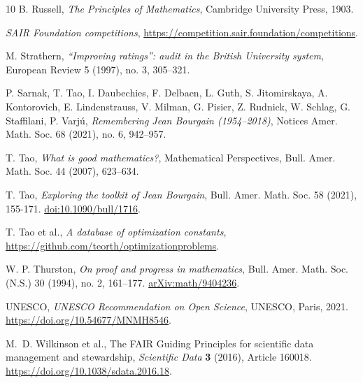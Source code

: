 \documentclass[12pt]{amsart}
\theoremstyle{definition}
\begin{document}
\begin{thebibliography}{10}
B. Russell, \emph{The Principles of Mathematics}, Cambridge University Press, 1903.

\emph{SAIR Foundation competitions}, \url{https://competition.sair.foundation/competitions}.

M. Strathern, \emph{``Improving ratings'': audit in the British University system}, European Review 5 (1997), no. 3, 305--321.

P. Sarnak, T. Tao, I. Daubechies, F. Delbaen, L. Guth, S. Jitomirskaya, A. Kontorovich, E. Lindenstrauss, V. Milman, G. Pisier, Z. Rudnick, W. Schlag, G. Staffilani, P. Varjú, \emph{Remembering Jean Bourgain (1954--2018)}, Notices Amer. Math. Soc. 68 (2021), no. 6, 942--957.

T. Tao, \emph{What is good mathematics?}, Mathematical Perspectives, Bull. Amer. Math. Soc. 44 (2007), 623--634.

T. Tao, \emph{Exploring the toolkit of Jean Bourgain}, Bull. Amer. Math. Soc. 58 (2021), 155-171. \href{https://doi.org/10.1090/bull/1716}{doi:10.1090/bull/1716}.

T. Tao et al., \emph{A database of optimization constants}, \url{https://github.com/teorth/optimizationproblems}.

W. P. Thurston, \emph{On proof and progress in mathematics}, Bull. Amer. Math. Soc. (N.S.) 30 (1994), no. 2, 161--177. \href{https://arxiv.org/abs/math/9404236}{arXiv:math/9404236}.

UNESCO,
\newblock \emph{UNESCO Recommendation on Open Science},
\newblock UNESCO, Paris, 2021.
\newblock \url{https://doi.org/10.54677/MNMH8546}.

M.~D. Wilkinson et al.,
\newblock The FAIR Guiding Principles for scientific data management
  and stewardship,
\newblock \emph{Scientific Data} \textbf{3} (2016), Article 160018.
\newblock \url{https://doi.org/10.1038/sdata.2016.18}.
\end{thebibliography}
\end{document}

